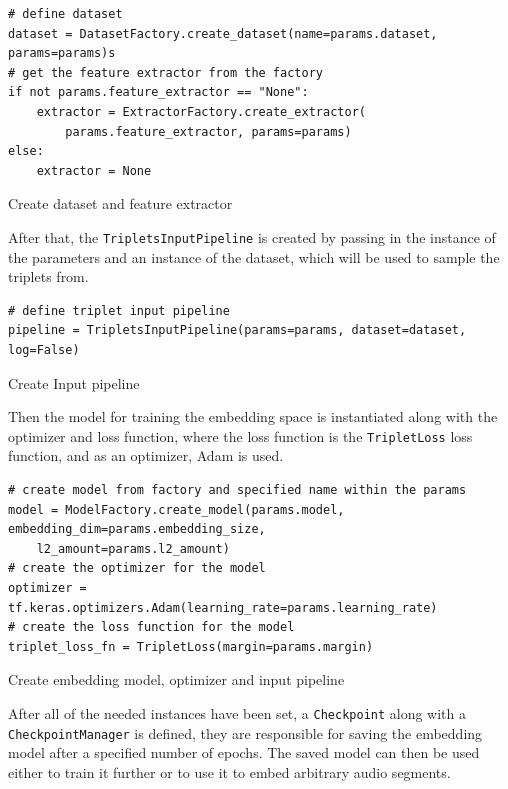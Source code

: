 \begin{code}[htbp]
\begin{verbatim}
# define dataset
dataset = DatasetFactory.create_dataset(name=params.dataset, params=params)s
# get the feature extractor from the factory
if not params.feature_extractor == "None":
    extractor = ExtractorFactory.create_extractor(
        params.feature_extractor, params=params)
else:
    extractor = None
\end{verbatim}
\caption{Create dataset and feature extractor}
\label{code:Create-Dataset-Extractor}
\end{code}
\noindent
After that, the \texttt{TripletsInputPipeline} is created by passing in the instance of the parameters and an instance of the dataset, which will be used to sample the triplets from.

\begin{code}[htbp]
\begin{verbatim}
# define triplet input pipeline
pipeline = TripletsInputPipeline(params=params, dataset=dataset, log=False)
\end{verbatim}
\caption{Create Input pipeline}
\label{code:Create-Pipeline}
\end{code}
\noindent
Then the model for training the embedding space is instantiated along with the optimizer and loss function, where the loss function is the \texttt{TripletLoss} loss function, and as an optimizer, Adam is used.

\begin{code}[htbp]
\begin{verbatim}
# create model from factory and specified name within the params
model = ModelFactory.create_model(params.model, embedding_dim=params.embedding_size, 
    l2_amount=params.l2_amount)
# create the optimizer for the model
optimizer = tf.keras.optimizers.Adam(learning_rate=params.learning_rate)
# create the loss function for the model
triplet_loss_fn = TripletLoss(margin=params.margin)
\end{verbatim}
\caption{Create embedding model, optimizer and input pipeline}
\label{code:Embedding-Model-Optimizer-Pipeline}
\end{code}
\noindent
After all of the needed instances have been set, a \texttt{Checkpoint} along with a \texttt{CheckpointManager} is defined, they are responsible for saving the embedding model after a specified number of epochs. The saved model can then be used either to train it further or to use it to embed arbitrary audio segments.

